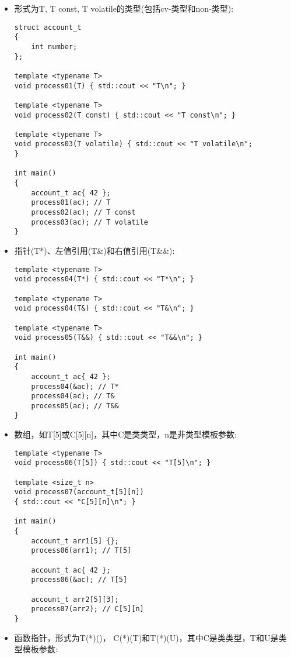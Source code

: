 \begin{itemize}
\item
形式为T, T const, T volatile的类型(包括cv-类型和non-类型):

\begin{lstlisting}[style=styleCXX]
struct account_t
{
	int number;
};

template <typename T>
void process01(T) { std::cout << "T\n"; }

template <typename T>
void process02(T const) { std::cout << "T const\n"; }

template <typename T>
void process03(T volatile) { std::cout << "T volatile\n";
}

int main()
{
	account_t ac{ 42 };
	process01(ac); // T
	process02(ac); // T const
	process03(ac); // T volatile
}
\end{lstlisting}

\item
指针(T*)、左值引用(T\&)和右值引用(T\&\&):

\begin{lstlisting}[style=styleCXX]
template <typename T>
void process04(T*) { std::cout << "T*\n"; }

template <typename T>
void process04(T&) { std::cout << "T&\n"; }

template <typename T>
void process05(T&&) { std::cout << "T&&\n"; }

int main()
{
	account_t ac{ 42 };
	process04(&ac); // T*
	process04(ac); // T&
	process05(ac); // T&&
}
\end{lstlisting}

\item
数组，如T[5]或C[5][n]，其中C是类类型，n是非类型模板参数:

\begin{lstlisting}[style=styleCXX]
template <typename T>
void process06(T[5]) { std::cout << "T[5]\n"; }

template <size_t n>
void process07(account_t[5][n])
{ std::cout << "C[5][n]\n"; }

int main()
{
	account_t arr1[5] {};
	process06(arr1); // T[5]
	
	account_t ac{ 42 };
	process06(&ac); // T[5]
	
	account_t arr2[5][3];
	process07(arr2); // C[5][n]
}
\end{lstlisting}

\item
函数指针，形式为T(*)()， C(*)(T)和T(*)(U)，其中C是类类型，T和U是类型模板参数:


\end{itemize}
